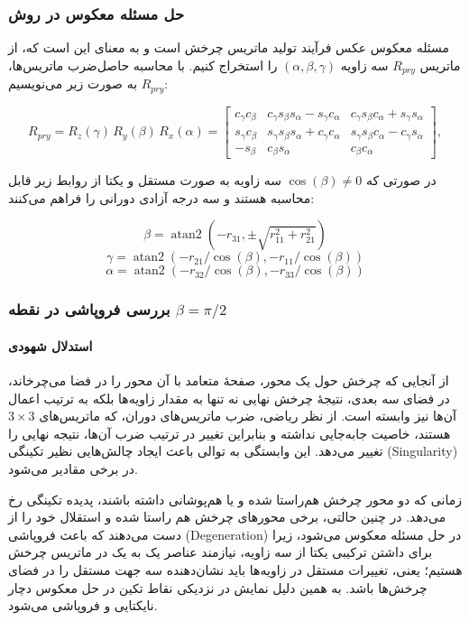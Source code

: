 \documentclass{article}
\begin{document}
\subsubsection{حل مسئله معکوس در روش }

مسئله معکوس   عکس فرآیند تولید ماتریس چرخش است و به معنای این است که، از ماتریس $R_{pry}$ سه زاویه $(\alpha, \beta, \gamma)$ را استخراج کنیم. 
با محاسبه حاصل‌ضرب ماتریس‌ها، $R_{pry}$ به صورت زیر می‌نویسیم:

\[
R_{pry} = R_z(\gamma)\,R_y(\beta)\,R_x(\alpha)
= \begin{bmatrix}
	c_\gamma c_\beta &
	c_\gamma s_\beta s_\alpha - s_\gamma c_\alpha &
	c_\gamma s_\beta c_\alpha + s_\gamma s_\alpha
	\\[4pt]
	s_\gamma c_\beta &
	s_\gamma s_\beta s_\alpha + c_\gamma c_\alpha &
	s_\gamma s_\beta c_\alpha - c_\gamma s_\alpha
	\\[4pt]
	-s_\beta &
	c_\beta s_\alpha &
	c_\beta c_\alpha
\end{bmatrix},
\]

در صورتی که $\cos(\beta)\neq 0 $ سه زاویه به صورت مستقل و یکتا از روابط زیر قابل محاسبه هستند و سه درجه آزادی دورانی را فراهم می‌کنند:

\[
\beta = \operatorname{atan2}(-r_{31}, \pm\sqrt{r_{11}^{2} + r_{21}^{2}})
\]
\[
\gamma = \operatorname{atan2}(-r_{21}/\cos(\beta), -r_{11}/\cos(\beta))
\]
\[
\alpha = \operatorname{atan2}(-r_{32}/\cos(\beta), -r_{33}/\cos(\beta))
\]

\subsubsection{بررسی فروپاشی در نقطه $\beta = \pi/2$ }

\paragraph{استدلال شهودی}

از آنجایی که چرخش حول یک محور، صفحهٔ متعامد با آن محور را در فضا می‌چرخاند، در فضای سه بعدی، نتیجهٔ چرخش نهایی نه تنها به مقدار زاویه‌ها بلکه به ترتیب اعمال آن‌ها نیز وابسته است. از نظر ریاضی، ضرب ماتریس‌های دوران، که ماتریس‌های $3\times3$ هستند، خاصیت جابه‌جایی نداشته و بنابراین تغییر در ترتیب ضرب آن‌ها، نتیجه نهایی را تغییر می‌دهد. این وابستگی به توالی باعث ایجاد چالش‌هایی نظیر تکینگی (Singularity) در برخی مقادیر می‌شود.

زمانی که دو محور چرخش هم‌راستا شده و یا هم‌پوشانی داشته باشند، پدیده تکینگی رخ می‌دهد. در چنین حالتی، برخی محورهای چرخش هم راستا شده و استقلال خود را از دست می‌دهند که باعث فروپاشی (Degeneration) در حل مسئله معکوس می‌شود، زیرا برای داشتن ترکیبی یکتا از سه زاویه، نیازمند عناصر یک به یک در ماتریس چرخش هستیم؛ یعنی، تغییرات مستقل در زاویه‌ها باید نشان‌دهنده سه جهت مستقل را در فضای چرخش‌ها باشد. به همین دلیل نمایش  در نزدیکی نقاط تکین در حل معکوس دچار نایکتایی و فروپاشی می‌شود.
\end{document}
